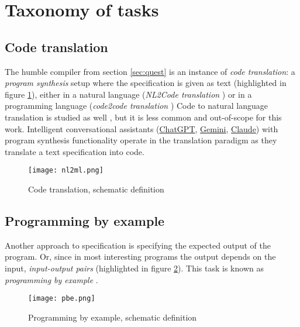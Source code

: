 
\newpage
\section{Taxonomy of tasks}
\label{sec:ps-task-taxonomy}

\subsection{Code translation}

The humble compiler from section \ref{sec:quest} is an instance of \emph{code translation}: a \emph{program synthesis} setup where the specification is given as text (highlighted in figure \ref{fig:nl2ml}), either in a natural language (\emph{NL2Code translation} \cite{wangNaturalLanguageCode2023, zanLargeLanguageModels2023}) or in a programming language (\emph{code2code translation} \cite{radfordImprovingLanguageUnderstanding})
Code to natural language translation is studied as well \cite[section 5.1]{leDeepLearningSource2020}, but it is less common and out-of-scope for this work.
Intelligent conversational assistants (\href{https://chat.openai.com/}{ChatGPT}, \href{https://gemini.google.com}{Gemini}, \href{https://claude.ai/}{Claude}) with program synthesis functionality operate in the translation paradigm as they translate a text specification into code.

\begin{figure}
    \centering
    \texttt{[image: nl2ml.png]}
    \caption{Code translation, schematic definition}
    \label{fig:nl2ml}
\end{figure}

\subsection{Programming by example}

Another approach to specification is specifying the expected output of the program. Or, since in most interesting programs the output depends on the input, \emph{input-output pairs} (highlighted in figure \ref{fig:pbe}). This task is known as \emph{programming by example} \cite{halbertProgrammingExample1984, psb2}.

\begin{figure}
    \centering
    \texttt{[image: pbe.png]}
    \caption{Programming by example, schematic definition}
    \label{fig:pbe}
\end{figure}

